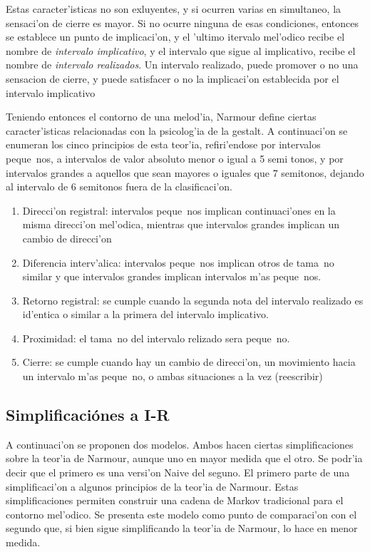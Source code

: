Estas caracter'isticas no son exluyentes, y si ocurren varias en simultaneo, la sensaci'on de cierre es mayor. 
Si no ocurre ninguna de esas condiciones, entonces se establece un punto de implicaci'on, y el 'ultimo itervalo mel'odico recibe el nombre
de \emph{intervalo implicativo}, y el intervalo que sigue al implicativo, recibe el nombre de \emph{intervalo realizados}. 
Un intervalo realizado, puede promover o no una sensacion de cierre, y puede satisfacer o no la implicaci'on establecida por el intervalo 
implicativo
 
Teniendo entonces el contorno de una melod'ia, Narmour define ciertas caracter'isticas relacionadas con la psicolog'ia de la gestalt. A continuaci'on 
se enumeran los cinco principios de esta teor'ia, refiri'endose por intervalos peque~nos, a intervalos de valor absoluto menor o igual a 5 semi tonos, y por intervalos
grandes a aquellos que sean mayores o iguales que 7 semitonos, dejando al intervalo de 6 semitonos fuera de la clasificaci'on.
\begin{enumerate}
 \item Direcci'on registral: intervalos peque~nos implican continuaci'ones en la misma direcci'on mel'odica, mientras que intervalos grandes implican un cambio de direcci'on
 \item Diferencia interv'alica: intervalos peque~nos implican otros de tama~no similar y que intervalos grandes implican intervalos m'as peque~nos. 
 \item Retorno registral: se cumple cuando la segunda nota del intervalo realizado es id'entica o similar a la primera del intervalo implicativo.
 \item Proximidad: el tama~no del intervalo relizado sera peque~no.
 \item Cierre: se cumple cuando hay un cambio de direcci'on, un movimiento hacia un intervalo m'as peque~no, o ambas situaciones a la vez (\alert{reescribir})
\end{enumerate}

\subsection{Simplificaci\'ones a I-R}
A continuaci'on se proponen dos modelos. Ambos hacen ciertas simplificaciones sobre la teor'ia de Narmour, aunque uno en mayor medida que el otro. Se 
podr'ia decir que el primero es una versi'on Naive del seguno. El primero parte de una simplificaci'on a algunos principios de la teor'ia de Narmour. Estas simplificaciones permiten construir una cadena de Markov tradicional para el contorno 
mel'odico. Se presenta este modelo como punto de comparaci'on con el segundo que, si bien sigue simplificando la teor'ia de Narmour, lo hace en menor medida. 

